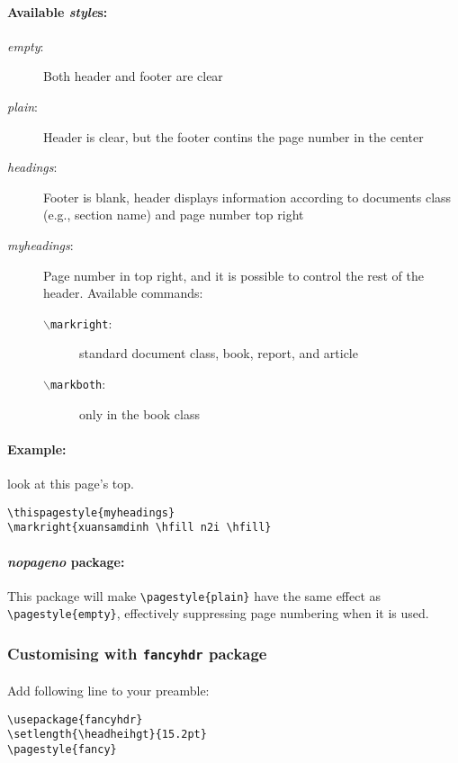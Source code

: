 \paragraph{Available \emph{style}s:}
\begin{description}
	\item[\emph{empty}:] Both header and footer are clear
	\item[\emph{plain}:] Header is clear, but the footer contins the page number in the center
	\item[\emph{headings}:] Footer is blank, header displays information according to documents class (e.g., section
		name) and page number top right
	\item[\emph{myheadings}:] Page number in top right, and it is possible to control the rest of the header. Available commands:
		\begin{description}
			\item[\texttt{$\backslash$markright}:] standard document class, book, report, and article
			\item[\texttt{$\backslash$markboth}:] only in the book class
		\end{description}
\end{description}

\paragraph{Example:} look at this page's top.
\begin{verbatim}
\thispagestyle{myheadings}
\markright{xuansamdinh \hfill n2i \hfill}
\end{verbatim}

\thispagestyle{myheadings}

\paragraph{\emph{nopageno} package:} This package will make \verb|\pagestyle{plain}| have the same effect as
\verb|\pagestyle{empty}|, effectively suppressing page numbering when it is used.

\subsubsection{Customising with \texttt{fancyhdr} package}

\paragraph{}Add following line to your preamble:
\begin{verbatim}
\usepackage{fancyhdr}
\setlength{\headheihgt}{15.2pt}
\pagestyle{fancy}
\end{verbatim}

